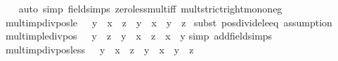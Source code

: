 \begin{isabellebody}
%
\isadelimproof
\ \ %
\endisadelimproof
%
\isatagproof
{}\isamarkupfalse%
\ {\isacharparenleft}{\kern0pt}auto\ simp{\isacharcolon}{\kern0pt}\ field{\isacharunderscore}{\kern0pt}simps\ zero{\isacharunderscore}{\kern0pt}less{\isacharunderscore}{\kern0pt}mult{\isacharunderscore}{\kern0pt}iff\ mult{\isacharunderscore}{\kern0pt}strict{\isacharunderscore}{\kern0pt}right{\isacharunderscore}{\kern0pt}mono{\isacharunderscore}{\kern0pt}neg{\isacharparenright}{\kern0pt}%
\endisatagproof
{\isafoldproof}%
%
\isadelimproof
\isanewline
%
\endisadelimproof
\isanewline
{}\isamarkupfalse%
\ mult{\isacharunderscore}{\kern0pt}imp{\isacharunderscore}{\kern0pt}div{\isacharunderscore}{\kern0pt}pos{\isacharunderscore}{\kern0pt}le{\isacharcolon}{\kern0pt}\ {\isachardoublequoteopen}{}\ {\isacharless}{\kern0pt}\ y\ {\isasymLongrightarrow}\ x\ {\isasymle}\ z\ {\isacharasterisk}{\kern0pt}\ y\ {\isasymLongrightarrow}\ x\ {\isacharslash}{\kern0pt}\ y\ {\isasymle}\ z{\isachardoublequoteclose}\isanewline
%
\isadelimproof
%
\endisadelimproof
%
\isatagproof
{}\isamarkupfalse%
\ {\isacharparenleft}{\kern0pt}subst\ pos{\isacharunderscore}{\kern0pt}divide{\isacharunderscore}{\kern0pt}le{\isacharunderscore}{\kern0pt}eq{\isacharcomma}{\kern0pt}\ assumption{\isacharplus}{\kern0pt}{\isacharparenright}{\kern0pt}%
\endisatagproof
{\isafoldproof}%
%
\isadelimproof
\isanewline
%
\endisadelimproof
\isanewline
{}\isamarkupfalse%
\ mult{\isacharunderscore}{\kern0pt}imp{\isacharunderscore}{\kern0pt}le{\isacharunderscore}{\kern0pt}div{\isacharunderscore}{\kern0pt}pos{\isacharcolon}{\kern0pt}\ {\isachardoublequoteopen}{}\ {\isacharless}{\kern0pt}\ y\ {\isasymLongrightarrow}\ z\ {\isacharasterisk}{\kern0pt}\ y\ {\isasymle}\ x\ {\isasymLongrightarrow}\ z\ {\isasymle}\ x\ {\isacharslash}{\kern0pt}\ y{\isachardoublequoteclose}\isanewline
%
\isadelimproof
%
\endisadelimproof
%
\isatagproof
{}\isamarkupfalse%
{\isacharparenleft}{\kern0pt}simp\ add{\isacharcolon}{\kern0pt}field{\isacharunderscore}{\kern0pt}simps{\isacharparenright}{\kern0pt}%
\endisatagproof
{\isafoldproof}%
%
\isadelimproof
\isanewline
%
\endisadelimproof
\isanewline
{}\isamarkupfalse%
\ mult{\isacharunderscore}{\kern0pt}imp{\isacharunderscore}{\kern0pt}div{\isacharunderscore}{\kern0pt}pos{\isacharunderscore}{\kern0pt}less{\isacharcolon}{\kern0pt}\ {\isachardoublequoteopen}{}\ {\isacharless}{\kern0pt}\ y\ {\isasymLongrightarrow}\ x\ {\isacharless}{\kern0pt}\ z\ {\isacharasterisk}{\kern0pt}\ y\ {\isasymLongrightarrow}\ x\ {\isacharslash}{\kern0pt}\ y\ {\isacharless}{\kern0pt}\ z{\isachardoublequoteclose}\isanewline

\end{isabellebody}
